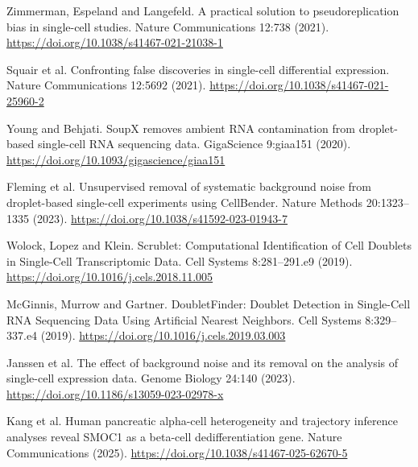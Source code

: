 \documentclass[11pt,letterpaper]{article}
\begin{document}
\begin{samepage}[9] Zimmerman, Espeland and Langefeld. A practical solution to pseudoreplication bias in single-cell studies. Nature Communications 12:738 (2021). \url{https://doi.org/10.1038/s41467-021-21038-1}\par\end{samepage}
\begin{samepage}[10] Squair et al. Confronting false discoveries in single-cell differential expression. Nature Communications 12:5692 (2021). \url{https://doi.org/10.1038/s41467-021-25960-2}\par\end{samepage}
\begin{samepage}[11] Young and Behjati. SoupX removes ambient RNA contamination from droplet-based single-cell RNA sequencing data. GigaScience 9:giaa151 (2020). \url{https://doi.org/10.1093/gigascience/giaa151}\par\end{samepage}
\begin{samepage}[12] Fleming et al. Unsupervised removal of systematic background noise from droplet-based single-cell experiments using CellBender. Nature Methods 20:1323–1335 (2023). \url{https://doi.org/10.1038/s41592-023-01943-7}\par\end{samepage}
\begin{samepage}[13] Wolock, Lopez and Klein. Scrublet: Computational Identification of Cell Doublets in Single-Cell Transcriptomic Data. Cell Systems 8:281–291.e9 (2019). \url{https://doi.org/10.1016/j.cels.2018.11.005}\par\end{samepage}
\begin{samepage}[14] McGinnis, Murrow and Gartner. DoubletFinder: Doublet Detection in Single-Cell RNA Sequencing Data Using Artificial Nearest Neighbors. Cell Systems 8:329–337.e4 (2019). \url{https://doi.org/10.1016/j.cels.2019.03.003}\par\end{samepage}
\begin{samepage}[15] Janssen et al. The effect of background noise and its removal on the analysis of single-cell expression data. Genome Biology 24:140 (2023). \url{https://doi.org/10.1186/s13059-023-02978-x}\par\end{samepage}
\begin{samepage}[16] Kang et al. Human pancreatic alpha-cell heterogeneity and trajectory inference analyses reveal SMOC1 as a beta-cell dedifferentiation gene. Nature Communications (2025). \url{https://doi.org/10.1038/s41467-025-62670-5}\par\end{samepage}
\end{document}
